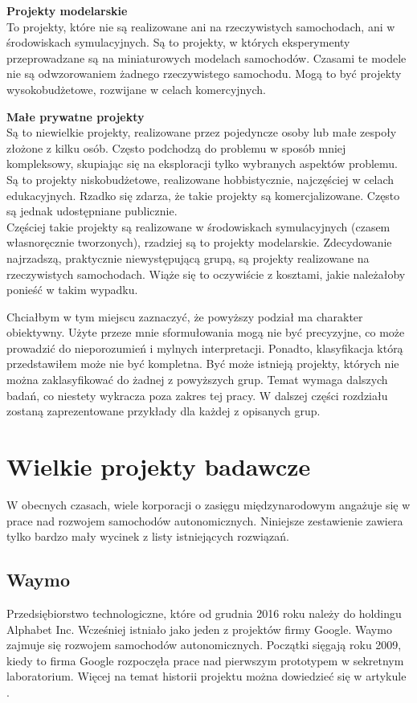 \begin{enumerate*}
\item \textbf{Projekty modelarskie} \\
To projekty, które nie są realizowane ani na rzeczywistych samochodach, ani w środowiskach symulacyjnych. Są to projekty, w których eksperymenty przeprowadzane są na miniaturowych modelach samochodów. Czasami te modele nie są odwzorowaniem żadnego rzeczywistego samochodu. Mogą to być projekty wysokobudżetowe, rozwijane w celach komercyjnych. \\

\item \textbf{Małe prywatne projekty} \\
Są to niewielkie projekty, realizowane przez pojedyncze osoby lub małe zespoły złożone z kilku osób. Często podchodzą do problemu w sposób mniej kompleksowy, skupiając się na eksploracji tylko wybranych aspektów problemu. Są to projekty niskobudżetowe, realizowane hobbistycznie, najczęściej w celach edukacyjnych. Rzadko się zdarza, że takie projekty są komercjalizowane. Często są jednak udostępniane publicznie. \\
Częściej takie projekty są realizowane w środowiskach symulacyjnych (czasem własnoręcznie tworzonych), rzadziej są to projekty modelarskie. Zdecydowanie najrzadszą, praktycznie niewystępującą grupą, są projekty realizowane na rzeczywistych samochodach. Wiąże się to oczywiście z kosztami, jakie należałoby ponieść w takim wypadku.
\end{enumerate*}

\newpage
Chciałbym w tym miejscu zaznaczyć, że powyższy podział ma charakter obiektywny. 
Użyte przeze mnie sformułowania mogą nie być precyzyjne, co może prowadzić do nieporozumień i mylnych interpretacji.
Ponadto, klasyfikacja którą przedstawiłem może nie być kompletna. Być może istnieją projekty, których nie można zaklasyfikować do żadnej z powyższych grup. Temat wymaga dalszych badań, co niestety wykracza poza zakres tej pracy. W dalszej części rozdziału zostaną zaprezentowane przykłady dla każdej z opisanych grup. 

\section{Wielkie projekty badawcze}
W obecnych czasach, wiele korporacji o zasięgu międzynarodowym angażuje się w prace nad rozwojem samochodów autonomicznych. 
Niniejsze zestawienie zawiera tylko bardzo mały wycinek z listy istniejących rozwiązań.

\subsection{Waymo}
Przedsiębiorstwo technologiczne, które od grudnia 2016 roku należy do holdingu Alphabet Inc. Wcześniej istniało jako jeden z projektów firmy Google. Waymo zajmuje się rozwojem samochodów autonomicznych. Początki sięgają roku 2009, kiedy to firma Google rozpoczęła prace nad pierwszym prototypem w sekretnym laboratorium. Więcej na temat historii projektu można dowiedzieć się w artykule \cite{google:carHistory}.

